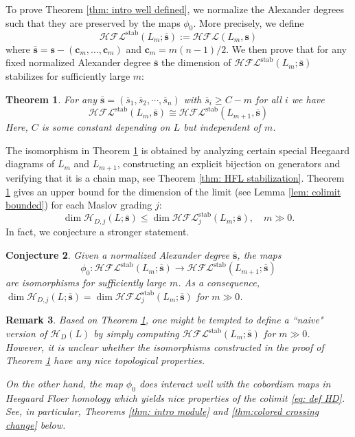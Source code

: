 \documentclass{amsart}
\newtheorem{theorem}{Theorem}[section]
\newtheorem{conjecture}[theorem]{Conjecture}
\newtheorem{remark}[theorem]{Remark}
\newcommand{\cHFL}{\mathcal{H\!F\! L}}
\newcommand{\ovl}{\overline}
\newcommand{\HD}{\mathcal{H}}
\newcommand{\EG}[1]{{\color{red}#1}}
\newcommand{\cc}{\mathbf{c}}
\newcommand{\stab}{\mathrm{stab}}
\renewcommand{\ss}{\mathbf{s}}
\begin{document}
To prove Theorem \ref{thm: intro well defined}, we normalize the Alexander degrees such that they are preserved by the maps $\phi_0$. More precisely, we define 
\begin{equation}
\label{eq: def normalized Alexander}
\cHFL^{\stab}(L_m;\overline{\ss}):=\cHFL(L_m,\ss)
\end{equation}
where 
$\overline{\ss}=\ss-(\cc_m,\ldots,\cc_m)$ and $\cc_m=m(n-1)/2$. We then  prove that for any fixed normalized Alexander degree $\overline{\ss}$ the dimension of $\cHFL^{\stab}(L_m;\overline{\ss})$ stabilizes for sufficiently large $m$:  
\begin{theorem}
\label{thm: HFL stabilization intro}
For any $\ovl{\ss}=(\ovl{s}_1,\ovl{s}_2,\cdots,\ovl{s}_n)$ with $\ovl{s}_i\ge C-m$ for all $i$ we have
\[\cHFL^{\stab}(L_m,\ovl{\ss})\cong \cHFL^{\stab}\left(L_{m+1},\ovl{\ss}\right)\]
Here, $C$ is some constant depending on $L$ but independent of $m$. 
\end{theorem}
The isomorphism in Theorem \ref{thm: HFL stabilization intro} is obtained by
analyzing certain special Heegaard diagrams of $L_{m}$ and $L_{m+1}$, constructing an explicit bijection on generators and verifying that it is a chain map, see Theorem \ref{thm: HFL stabilization}.
Theorem \ref{thm: HFL stabilization intro} gives an upper bound for the dimension of the limit (see Lemma \ref{lem: colimit bounded}) for each Maslov grading $j$:
\begin{equation}
\label{eq: colored dim estimate}
\dim \HD_{D,j}(L; \overline{\ss})\le \dim \cHFL^{\stab}_j(L_m;\overline{\ss}),\quad m\gg 0.
\end{equation}
In fact, we conjecture a stronger statement. %

\begin{conjecture}
\label{conj: isomorphism}
Given a normalized Alexander degree $\overline{\ss}$, the maps
$$
\phi_0:\cHFL^{\stab}\left(L_m;\overline{\ss}\right)\to \cHFL^{\stab}\left(L_{m+1};\overline{\ss}\right)
$$
are isomorphisms for sufficiently large $m$. As a consequence, $\dim \HD_{D,j}(L;\overline{\ss})=\dim \cHFL^{\stab}_j\left(L_m;\overline{\ss}\right)$ for $m\gg 0$.
\end{conjecture}

\begin{remark}
Based on Theorem \ref{thm: HFL stabilization intro}, one might be tempted to define a ``naive" version of $\HD_D(L)$ by simply computing $\cHFL^{\stab}\left(L_m;\overline{\ss}\right)$ for $m\gg 0$. However, it is unclear whether the isomorphisms constructed in the proof of Theorem \ref{thm: HFL stabilization intro} have any nice topological properties.

On the other hand, the map $\phi_0$ does interact well with the cobordism maps in Heegaard Floer homology which yields nice properties of the colimit \eqref{eq: def HD}. See, in particular, Theorems \ref{thm: intro module} and \ref{thm:colored crossing change} below.

\end{remark}
\end{document}
